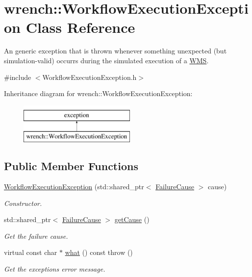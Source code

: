 \hypertarget{classwrench_1_1_workflow_execution_exception}{}\section{wrench\+:\+:Workflow\+Execution\+Exception Class Reference}
\label{classwrench_1_1_workflow_execution_exception}


An generic exception that is thrown whenever something unexpected (but simulation-\/valid) occurrs during the simulated execution of a \hyperlink{classwrench_1_1_w_m_s}{W\+MS}.  




{\ttfamily \#include $<$Workflow\+Execution\+Exception.\+h$>$}

Inheritance diagram for wrench\+:\+:Workflow\+Execution\+Exception\+:\begin{figure}[H]
\begin{center}
\leavevmode
\includegraphics[height=2.000000cm]{classwrench_1_1_workflow_execution_exception}
\end{center}
\end{figure}
\subsection*{Public Member Functions}
\begin{DoxyCompactItemize}
\item 
\hyperlink{classwrench_1_1_workflow_execution_exception_a7b1eef40dc7846d0606ac66641379ced}{Workflow\+Execution\+Exception} (std\+::shared\+\_\+ptr$<$ \hyperlink{classwrench_1_1_failure_cause}{Failure\+Cause} $>$ cause)
\begin{DoxyCompactList}\small\item\em Constructor. \end{DoxyCompactList}\item 
std\+::shared\+\_\+ptr$<$ \hyperlink{classwrench_1_1_failure_cause}{Failure\+Cause} $>$ \hyperlink{classwrench_1_1_workflow_execution_exception_a45fbbd2bc144da41f1fd09efcdaa2481}{get\+Cause} ()
\begin{DoxyCompactList}\small\item\em Get the failure cause. \end{DoxyCompactList}\item 
virtual const char $\ast$ \hyperlink{classwrench_1_1_workflow_execution_exception_a54f37236e3bfd00490835675220863c4}{what} () const  throw ()
\begin{DoxyCompactList}\small\item\em Get the exception\textquotesingle{}s error message. \end{DoxyCompactList}\end{DoxyCompactItemize}


